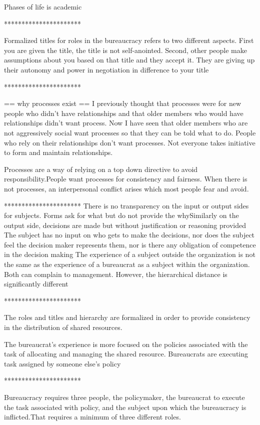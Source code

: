 
Phases of life is academic

**********************

Formalized titles for roles in the bureaucracy refers to two different aspects.
First you are given the title, the title is not self-anointed.
Second, other people make assumptions about you based on that title and they accept it. They are giving up their autonomy and power in negotiation in difference to your title

**********************

== why processes exist ==
I previously thought that processes were for new people who didn't have relationships and that older members who would have relationships didn't want process. Now I have seen that older members who are not aggressively social want processes so that they can be told what to do. People who rely on their relationships don't want processes. Not everyone takes initiative to form and maintain relationships.

Processes are a way of relying on a top down directive to avoid responsibility.People want processes for consistency and fairness. When there is not processes, an interpersonal conflict arises which most people fear and avoid.

**********************
There is no transparency on the input or output sides for subjects. Forms ask for what but do not provide the whySimilarly on the output side, decisions are made but without justification or reasoning provided
The subject has no input on who gets to make the decisions, nor does the subject feel the decision maker represents them, nor is there any obligation of competence in the decision making
The experience of a subject outside the organization is not the same as the experience of a bureaucrat as a subject within the organization. Both can complain to management. However, the hierarchical distance is significantly different

**********************

The roles and titles and hierarchy are formalized in order to provide consistency in the distribution of shared resources.

The bureaucrat's experience is more focused on the policies associated with the task of allocating and managing the shared resource. Bureaucrats are executing task assigned by someone else's policy

**********************

Bureaucracy requires three people, the policymaker, the bureaucrat to execute the task associated with policy, and the subject upon which the bureaucracy is inflicted.That requires a minimum of three different roles.

